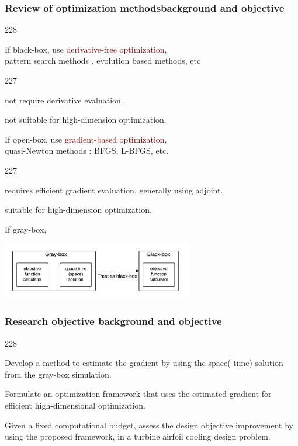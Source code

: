 \documentclass{beamer}
\let\oldcite=\cite
\renewcommand{\cite}[1]{\textcolor[rgb]{.4,.4,.85}{\oldcite{#1}}}
\newcommand{\barrow}{\item[\color{darkred}\ding{228}]}
\newcommand{\carrow}{\item[\color{darkred}\ding{227}]}
\begin{document}
\begin{frame}
    \frametitle{Review of optimization methods\hfill \scriptsize{background and objective}}\small
    \begin{dinglist}{228}
        \barrow If {black-box}, use \textcolor{darkred}{derivative-free optimization},\\
                \scriptsize{
                pattern search methods \cite{Tarma03}, evolution based methods\cite{Eberhart 10, Davis 10}, etc}
                \small
                \begin{dinglist}{227}
                    \carrow not require derivative evaluation.
                    \carrow not suitable for high-dimension optimization.
                \end{dinglist}
        \barrow If open-box, use \textcolor{darkred}{gradient-based optimization},\\
                \scriptsize
                quasi-Newton methods \cite{John 77}: BFGS, L-BFGS, etc.
                \small
                \begin{dinglist}{227}
                    \carrow requires efficient gradient evaluation, generally using adjoint.
                    \carrow suitable for high-dimension optimization.
                \end{dinglist}
        \barrow If gray-box,
    \end{dinglist}
    \begin{center}
        \includegraphics[height=2.5cm]{treat.png}
    \end{center}   
\end{frame}


\begin{frame}
    \frametitle{Research objective \hfill \scriptsize{background and objective}}\small
    \begin{dinglist}{228}
        \barrow Develop a method to estimate the gradient by using the space(-time) solution
                from the gray-box simulation.
        \vspace{.1cm}
        \barrow Formulate an optimization framework that uses the estimated gradient for efficient high-dimensional 
                optimization.
        \vspace{.1cm}
        \barrow Given a fixed computational budget, assess the design objective improvement 
                by using the proposed framework, in a turbine airfoil cooling design problem.
    \end{dinglist}
\end{frame}
\end{document}
